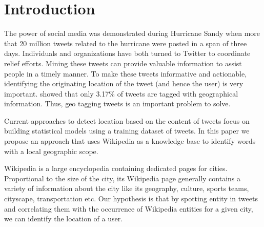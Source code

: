 \section{Introduction}
\label{sec:Introduction}

The power of social media was demonstrated during Hurricane Sandy when more that 20 million tweets related to the hurricane were posted in a span of three days. Individuals and organizations have both turned to Twitter to coordinate relief efforts. Mining these tweets can provide valuable information to assist people in a timely manner\cite{purohit2013emergency}. To make these tweets informative and actionable, identifying the originating location of the tweet (and hence the user) is very important. \cite{morstatter2013sample} showed that only 3.17\% of tweets are tagged with geographical information. Thus, geo tagging tweets is an important problem to solve.

Current approaches to detect location based on the content of tweets focus on building statistical models using a training dataset of tweets. In this paper we propose an approach that uses Wikipedia as a knowledge base to identify words with a local geographic scope. 

Wikipedia is a large encyclopedia containing dedicated pages for cities. Proportional to the size of the city, its Wikipedia page generally contains a variety of information about the city like its geography, culture, sports teams, cityscape, transportation etc. Our hypothesis is that by spotting entity in tweets and correlating them with the occurrence of Wikipedia entities for a given city, we can identify the location of a user. 





